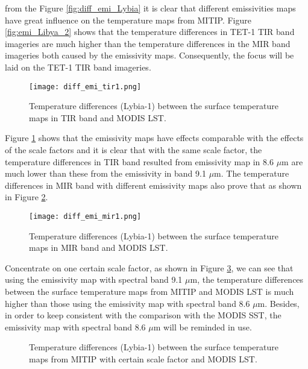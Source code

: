 \noindent from the Figure \ref{fig:diff_emi_Lybia} it is clear that different emissivities maps have great influence on the temperature maps from MITIP.  Figure \ref{fig:emi_Libya_2} shows that the temperature differences in TET-1 TIR band imageries are much higher than the temperature differences in the MIR band imageries both caused by the emissivity maps. Consequently, the focus will be laid on the TET-1 TIR band imageries.\\

\begin{figure}[!htbp]
\centering
\texttt{[image: diff\_emi\_tir1.png]}
\caption{Temperature differences (Lybia-1) between the surface temperature maps in TIR band and MODIS LST.}
\label{fig:diff_emi_tir1}
\end{figure}

\noindent Figure \ref{fig:diff_emi_tir1} shows that the emissivity maps have effects comparable with the effects of the scale factors and it is clear that with the same scale factor, the temperature differences in TIR band resulted from emissivity map in 8.6 $\mu$m are much lower than these from the emissivity in band 9.1 $\mu$m. The temperature differences in MIR band with different emissivity maps also prove that as shown in Figure \ref{fig:diff_emi_mir1}.\\

\begin{figure}[!htbp]
\centering
\texttt{[image: diff\_emi\_mir1.png]}
\caption{Temperature differences (Lybia-1) between the surface temperature maps in MIR band and MODIS LST.}
\label{fig:diff_emi_mir1}
\end{figure}

\noindent Concentrate on one certain scale factor, as shown in Figure \ref{fig:diff_emi_Lybia2}, we can see that using the emissivity map with spectral band 9.1 $\mu$m, the temperature differences between the surface temperature maps from MITIP and MODIS LST is much higher than those using the emissivity map with spectral band 8.6 $\mu$m. Besides, in order to keep consistent with the comparison with the MODIS SST, the emissivity map with spectral band 8.6 $\mu$m will be reminded in use.\\

\begin{figure}[!htbp]
\centering
{}
\hspace{0.5in}
\caption{Temperature differences (Lybia-1) between the surface temperature maps from MITIP with certain scale factor and MODIS LST.}
\label{fig:diff_emi_Lybia2}
\end{figure}

